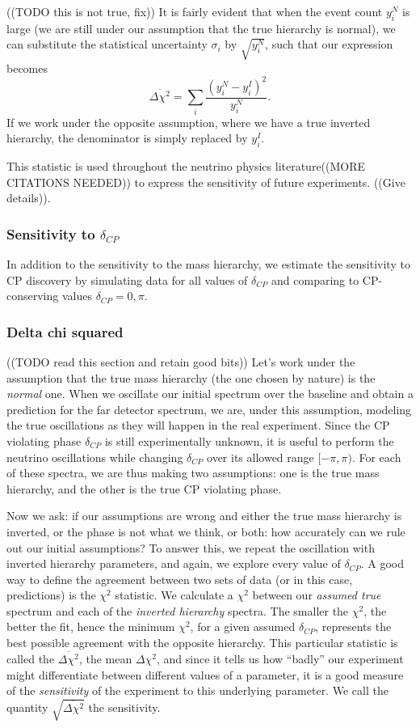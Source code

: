 \documentclass[10pt, a4paper]{article}
\begin{document}
((TODO this is not true, fix))
It is fairly evident\cite{qian} that when the
event count $y^N_i$ is large (we are still under our assumption that the true hierarchy
is normal), we can substitute the statistical uncertainty $\sigma_i$ by
$\sqrt{y^N_i}$, such that our expression becomes
$$\overline{\Delta\chi^2} = \sum_i \frac{(y^N_i - y^I_i)^2}{y^N_i}.$$
If we work under the opposite assumption, where we have a true inverted
hierarchy, the denominator is simply replaced by $y^I_i$. 

This statistic is used throughout the neutrino physics literature\cite{cdr,
martin-albo}((MORE CITATIONS NEEDED)) to express the sensitivity of future experiments.
((Give details)).



\subsubsection{Sensitivity to $\delta_{CP}$}
In addition to the sensitivity to the mass hierarchy, we estimate the
sensitivity to CP discovery by simulating data for all values of $\delta_{CP}$
and comparing to CP-conserving values $\delta_{CP} = 0, \pi$.



\subsubsection{Delta chi squared} 
((TODO read this section and retain good bits))
Let's work under the assumption that the true mass hierarchy (the one chosen by
nature) is the \emph{normal} one. When we oscillate our initial spectrum over
the baseline and obtain a prediction for the far detector spectrum, we are,
under this assumption, modeling the true oscillations as they will happen in
the real experiment. Since the CP violating phase $\delta_{CP}$ is still
experimentally unknown, it is useful to perform the neutrino oscillations while
changing $\delta_{CP}$ over its allowed range $[-\pi,\pi)$. For each of these
spectra, we are thus making two assumptions: one is the true mass hierarchy,
and the other is the true CP violating phase.

Now we ask: if our assumptions are wrong and either the true mass hierarchy is
inverted, or the phase is not what we think, or both: how accurately can we
rule out our initial assumptions? To answer this, we repeat the oscillation
with inverted hierarchy parameters, and again, we explore every value of
$\delta_{CP}$. A good way to define the agreement between two sets of data (or
in this case, predictions) is the $\chi^2$ statistic. We calculate a $\chi^2$
between our \emph{assumed true} spectrum and each of the \emph{inverted
hierarchy} spectra. The smaller the $\chi^2$, the better the fit, hence the
minimum $\chi^2$, for a given assumed $\delta_{CP}$, represents the best
possible agreement with the opposite hierarchy. This particular statistic is
called the $\overline{\Delta\chi^2}$, the mean $\Delta\chi^2$, and since it tells
us how ``badly'' our experiment might differentiate between different values of
a parameter,  it is a good measure of the \emph{sensitivity} of the experiment
to this underlying parameter.  We call the quantity
$\sqrt{\overline{\Delta\chi^2}}$ the sensitivity.
\end{document}
